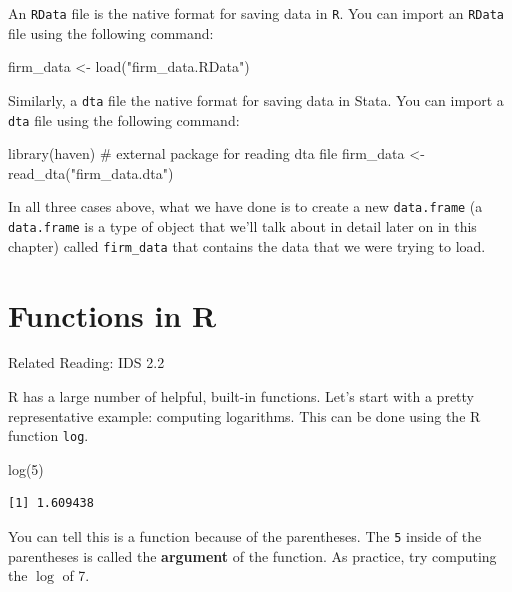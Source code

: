\documentclass[
  letterpaper,
  DIV=11,
  numbers=noendperiod]{scrreprt}
\newenvironment{Shaded}{\begin{snugshade}}{\end{snugshade}}
\newcommand{\CommentTok}[1]{\textcolor[rgb]{0.37,0.37,0.37}{#1}}
\newcommand{\DecValTok}[1]{\textcolor[rgb]{0.68,0.00,0.00}{#1}}
\newcommand{\FunctionTok}[1]{\textcolor[rgb]{0.28,0.35,0.67}{#1}}
\newcommand{\NormalTok}[1]{\textcolor[rgb]{0.00,0.23,0.31}{#1}}
\newcommand{\OtherTok}[1]{\textcolor[rgb]{0.00,0.23,0.31}{#1}}
\newcommand{\StringTok}[1]{\textcolor[rgb]{0.13,0.47,0.30}{#1}}
\begin{document}
An \texttt{RData} file is the native format for saving data in
\texttt{R}. You can import an \texttt{RData} file using the following
command:

\begin{Shaded}
\begin{Highlighting}[]
\NormalTok{firm\_data }\OtherTok{\textless{}{-}} \FunctionTok{load}\NormalTok{(}\StringTok{"firm\_data.RData"}\NormalTok{)}
\end{Highlighting}
\end{Shaded}

Similarly, a \texttt{dta} file the native format for saving data in
Stata. You can import a \texttt{dta} file using the following command:

\begin{Shaded}
\begin{Highlighting}[]
\FunctionTok{library}\NormalTok{(haven) }\CommentTok{\# external package for reading dta file}
\NormalTok{firm\_data }\OtherTok{\textless{}{-}} \FunctionTok{read\_dta}\NormalTok{(}\StringTok{"firm\_data.dta"}\NormalTok{)}
\end{Highlighting}
\end{Shaded}

In all three cases above, what we have done is to create a new
\texttt{data.frame} (a \texttt{data.frame} is a type of object that
we'll talk about in detail later on in this chapter) called
\texttt{firm\_data} that contains the data that we were trying to load.

\section{Functions in R}\label{functions-in-r}

Related Reading: IDS 2.2

R has a large number of helpful, built-in functions. Let's start with a
pretty representative example: computing logarithms. This can be done
using the R function \texttt{log}.

\begin{Shaded}
\begin{Highlighting}[]
\FunctionTok{log}\NormalTok{(}\DecValTok{5}\NormalTok{)}
\end{Highlighting}
\end{Shaded}

\begin{verbatim}
[1] 1.609438
\end{verbatim}

You can tell this is a function because of the parentheses. The
\texttt{5} inside of the parentheses is called the \textbf{argument} of
the function. As practice, try computing the \(\log\) of 7.
\end{document}
